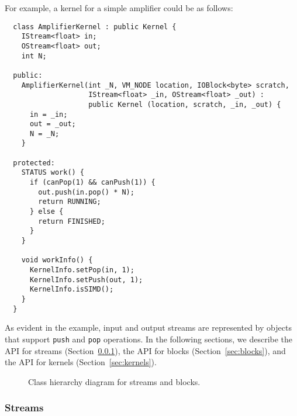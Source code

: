 \noindent For example, a kernel for a simple amplifier could be as follows:
{\small
\begin{verbatim}
  class AmplifierKernel : public Kernel {
    IStream<float> in;
    OStream<float> out;
    int N;

  public:
    AmplifierKernel(int _N, VM_NODE location, IOBlock<byte> scratch, 
                    IStream<float> _in, OStream<float> _out) : 
                    public Kernel (location, scratch, _in, _out) {
      in = _in;
      out = _out;
      N = _N;
    }

  protected:
    STATUS work() {
      if (canPop(1) && canPush(1)) {
        out.push(in.pop() * N);
        return RUNNING;
      } else {
        return FINISHED;
      }
    }

    void workInfo() {
      KernelInfo.setPop(in, 1);
      KernelInfo.setPush(out, 1);
      KernelInfo.isSIMD();
    }
  }  
\end{verbatim}}
As evident in the example, input and output streams are represented by
objects that support {\tt push} and {\tt pop} operations.  In the
following sections, we describe the API for streams
(Section~\ref{sec:kerstreams}), the API for blocks
(Section~\ref{sec:blocks}), and the API for kernels
(Section~\ref{sec:kernels}).

\begin{figure}[t]
\begin{center}
\end{center}
\vspace{-12pt}
\caption{Class hierarchy diagram for streams and blocks.\protect\label{fig:inherit}}
\end{figure}



\subsubsection{Streams}
\label{sec:kerstreams}


